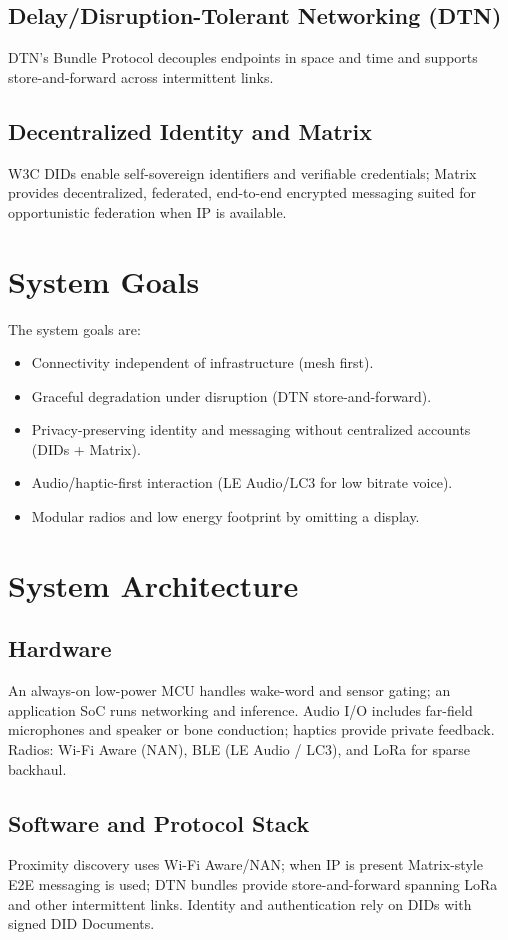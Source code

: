 \documentclass[10pt,journal,compsoc]{IEEEtran}
\begin{document}
\subsection{Delay/Disruption-Tolerant Networking (DTN)}
DTN's Bundle Protocol decouples endpoints in space and time and supports store-and-forward across intermittent links.

\subsection{Decentralized Identity and Matrix}
W3C DIDs enable self-sovereign identifiers and verifiable credentials; Matrix provides decentralized, federated, end-to-end encrypted messaging suited for opportunistic federation when IP is available.

\section{System Goals}
The system goals are:
\begin{itemize}
  \item Connectivity independent of infrastructure (mesh first).
  \item Graceful degradation under disruption (DTN store-and-forward).
  \item Privacy-preserving identity and messaging without centralized accounts (DIDs + Matrix).
  \item Audio/haptic-first interaction (LE Audio/LC3 for low bitrate voice).
  \item Modular radios and low energy footprint by omitting a display.
\end{itemize}

\section{System Architecture}
\subsection{Hardware}
An always-on low-power MCU handles wake-word and sensor gating; an application SoC runs networking and inference. Audio I/O includes far-field microphones and speaker or bone conduction; haptics provide private feedback. Radios: Wi-Fi Aware (NAN), BLE (LE Audio / LC3), and LoRa for sparse backhaul.

\subsection{Software and Protocol Stack}
Proximity discovery uses Wi-Fi Aware/NAN; when IP is present Matrix-style E2E messaging is used; DTN bundles provide store-and-forward spanning LoRa and other intermittent links. Identity and authentication rely on DIDs with signed DID Documents.
\end{document}
